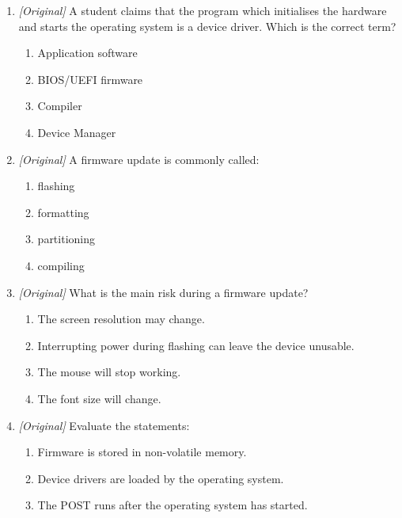\documentclass[11pt]{article}
\begin{document}
\begin{enumerate}[label=\textbf{Q\arabic*.}, leftmargin=*]
\begin{enumerate}[label=\Alph*.]
    \item It supports very large disks using GPT and offers a graphical
      setup.
    \item It works only on 32-bit computers.
    \item It makes device drivers unnecessary.
  \end{enumerate}
\item \textit{[Original]} A student claims that the program which initialises
  the hardware and starts the operating system is a device driver. Which is
  the correct term?
  \begin{enumerate}[label=\Alph*.]
    \item Application software
    \item BIOS/UEFI firmware
    \item Compiler
    \item Device Manager
  \end{enumerate}
\item \textit{[Original]} A firmware update is commonly called:
  \begin{enumerate}[label=\Alph*.]
    \item flashing
    \item formatting
    \item partitioning
    \item compiling
  \end{enumerate}
\item \textit{[Original]} What is the main risk during a firmware update?
  \begin{enumerate}[label=\Alph*.]
    \item The screen resolution may change.
    \item Interrupting power during flashing can leave the device unusable.
    \item The mouse will stop working.
    \item The font size will change.
  \end{enumerate}
\item \textit{[Original]} Evaluate the statements:
  \begin{enumerate}[label=\Roman*.]
    \item Firmware is stored in non-volatile memory.
    \item Device drivers are loaded by the operating system.
    \item The POST runs after the operating system has started.
  \end{enumerate}
  \begin{enumerate}[label=\Alph*.]

\end{enumerate}
\end{enumerate}
\end{document}
